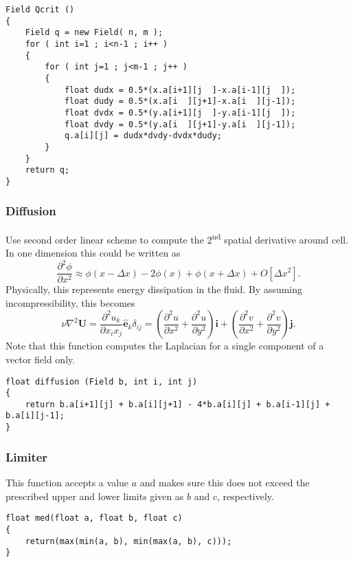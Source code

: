 \documentclass[notitlepage]{article}
\begin{document}
\begin{lstlisting}[style=myCpp]
Field Qcrit ()
{
	Field q = new Field( n, m );
	for ( int i=1 ; i<n-1 ; i++ )
	{
		for ( int j=1 ; j<m-1 ; j++ )
		{
			float dudx = 0.5*(x.a[i+1][j  ]-x.a[i-1][j  ]);
			float dudy = 0.5*(x.a[i  ][j+1]-x.a[i  ][j-1]);
			float dvdx = 0.5*(y.a[i+1][j  ]-y.a[i-1][j  ]);
			float dvdy = 0.5*(y.a[i  ][j+1]-y.a[i  ][j-1]);
			q.a[i][j] = dudx*dvdy-dvdx*dudy;
		}
	}
	return q;
}
\end{lstlisting}

\subsubsection{Diffusion}

Use second order linear scheme to compute the 2\textsuperscript{nd} spatial derivative around cell.
In one dimension this could be written as
%
\begin{equation}
\frac{\partial^2 \phi}{\partial x^2} \approx \phi(x-\Delta x) -2 \phi(x) + \phi(x + \Delta x) + O[\Delta x^2] .
\end{equation}
%
Physically, this represents energy dissipation in the fluid. By assuming incompressibility, this
becomes
%
\begin{equation}
\nu \nabla^2 \mathbf{U} = \frac{\partial^2 u_k}{\partial x_i x_j} \mathbf{\hat{e}}_k \delta_{ij} = 
	\left( \frac{\partial^2 u}{\partial x^2} + \frac{\partial^2 u}{\partial y^2} \right) \mathbf{i}
	+\left( \frac{\partial^2 v}{\partial x^2} + \frac{\partial^2 v}{\partial y^2} \right) \mathbf{j} .
\end{equation}
%
Note that this function computes the Laplacian for a single component of a vector field only.

\begin{lstlisting}[style=myCpp]
float diffusion (Field b, int i, int j)
{
	return b.a[i+1][j] + b.a[i][j+1] - 4*b.a[i][j] + b.a[i-1][j] + b.a[i][j-1];
}
\end{lstlisting}

\subsubsection{Limiter}

This function accepts a value $a$ and makes sure this does not exceed the prescribed
upper and lower limits given as $b$ and $c$, respectively.

\begin{lstlisting}[style=myCpp]
float med(float a, float b, float c)
{
	return(max(min(a, b), min(max(a, b), c)));
}
\end{lstlisting}
\end{document}
